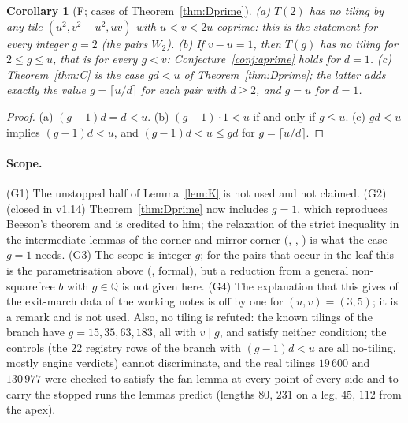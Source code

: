 \documentclass[11pt,reqno]{amsart}
\theoremstyle{plain}
\newtheorem{corollary}[theorem]{Corollary}
\theoremstyle{definition}
\newcommand{\Q}{\mathbb{Q}}
\newcommand{\sF}{\textup{\textsf{F}}}
\begin{document}
\begin{corollary}[\sF{}; cases of Theorem~\ref{thm:Dprime}]\label{cor:W2}
\textup{(a)} $T(2)$ has no tiling by any tile $(u^2,v^2-u^2,uv)$ with $u<v<2u$ coprime: this is the statement for every integer $g=2$ (the pairs $W_2$). \textup{(b)} If $v-u=1$, then $T(g)$ has no tiling for $2\le g\le u$, that is for every $g<v$:
Conjecture~\ref{conj:aprime} holds for $d=1$. \textup{(c)} Theorem~\ref{thm:C} is the case $gd<u$ of Theorem~\ref{thm:Dprime}; the latter adds exactly the value $g=\lceil u/d\rceil$ for each pair with $d\ge2$, and $g=u$ for $d=1$.
\end{corollary}
\begin{proof}
(a) $(g-1)d=d<u$. (b) $(g-1)\cdot1<u$ if and only if $g\le u$. (c) $gd<u$ implies $(g-1)d<u$, and $(g-1)d<u\le gd$ for $g=\lceil u/d\rceil$.
\end{proof}

\paragraph{Scope.}
(G1) The unstopped half of Lemma~\ref{lem:K} is not used and not claimed. (G2) (closed in v1.14) Theorem~\ref{thm:Dprime} now includes $g=1$, which reproduces Beeson's theorem and is credited to him; the relaxation of the strict inequality in the intermediate lemmas of the corner and mirror-corner (, , ) is what the case $g=1$ needs. (G3) The scope is integer $g$; for the pairs that occur in the leaf this is
the parametrisation above (, formal), but a reduction from a general non-squarefree $b$ with $g\in\Q$ is not given here. (G4) The explanation that this gives of the exit-march data of the working notes is off by one for $(u,v)=(3,5)$; it is a remark and is not used.
Also, no tiling is refuted: the known tilings of the branch have $g=15,35,63,183$, all with $v\mid g$, and satisfy neither condition; the controls (the 22 registry rows of the branch with $(g-1)d<u$ are all
no-tiling, mostly engine verdicts) cannot discriminate, and the real tilings $19\,600$ and $130\,977$ were checked to satisfy the fan lemma at every point of every side and to carry the stopped runs the lemmas predict (lengths $80$, $231$ on a leg,
$45$, $112$ from the apex).
\end{document}
